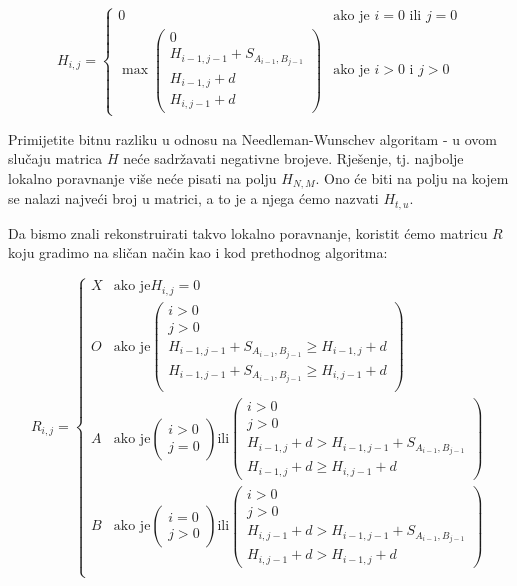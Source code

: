 \documentclass[times, utf8, zavrsni]{fer}
\begin{document}
$$
H_{i,j} =
\left\{ \begin{array}{ll}
	0 & \mbox{ako je } i=0 \mbox{ ili } j=0 \\
	\max \left( \begin{array}{l}
		0 \\
		H_{i-1,j-1} + S_{A_{i-1}, B_{j-1}} \\
		H_{i-1, j} + d \\
		H_{i, j-1} + d
	\end{array} \right) & \mbox{ako je } i>0 \mbox{ i } j>0
\end{array} \right.
$$

Primijetite bitnu razliku u odnosu na Needleman-Wunschev algoritam - u ovom
slučaju matrica $H$ neće sadržavati negativne brojeve. Rješenje, tj. najbolje
lokalno poravnanje više neće pisati na polju $H_{N, M}$. Ono će biti na polju 
na kojem se nalazi najveći broj u matrici, a to je a njega ćemo nazvati
$H_{t, u}$.

Da bismo znali rekonstruirati takvo lokalno poravnanje, koristit ćemo matricu
$R$ koju gradimo na sličan način kao i kod prethodnog algoritma:

$$
R_{i,j} =  \left\{
	\begin{array}{ll}
		X & \mbox{ako je} H_{i,j}=0 \\
		O & \mbox{ako je} \left( \begin{array}{l} i>0 \\ j>0 \\
				H_{i-1,j-1} + S_{A_{i-1}, B_{j-1}} \geq H_{i-1,j} + d \\
				H_{i-1,j-1} + S_{A_{i-1}, B_{j-1}} \geq H_{i,j-1} + d \\
			\end{array} \right) \\
		A & \mbox{ako je} \left( \begin{array}{l} i>0 \\ j=0 \end{array} \right)
			\mbox{ili} \left( \begin{array}{l} i>0 \\ j>0 \\
				H_{i-1,j} + d > H_{i-1,j-1} + S_{A_{i-1}, B_{j-1}} \\
				H_{i-1,j} + d \geq H_{i,j-1} + d
			\end{array} \right) \\
		B & \mbox{ako je} \left( \begin{array}{l} i=0 \\ j>0 \end{array} \right)
			\mbox{ili} \left( \begin{array}{l} i>0 \\ j>0 \\
				H_{i,j-1} + d > H_{i-1,j-1} + S_{A_{i-1}, B_{j-1}} \\
				H_{i,j-1} + d > H_{i-1,j} + d
			\end{array} \right) \\
	\end{array}
\right.
$$
\end{document}
